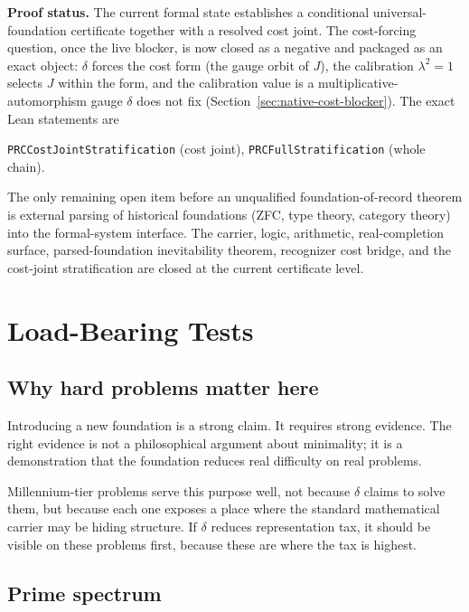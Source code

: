 \documentclass[11pt,a4paper]{article}
\theoremstyle{definition}
\theoremstyle{remark}
\begin{document}
\medskip
\noindent\textbf{Proof status.}
The current formal state establishes a conditional universal-foundation
certificate together with a resolved cost joint. The cost-forcing question, once
the live blocker, is now closed as a negative and packaged as an exact object:
$\delta$ forces the cost form (the gauge orbit of $J$), the calibration
$\lambda^2 = 1$ selects $J$ within the form, and the calibration value is a
multiplicative-automorphism gauge $\delta$ does not fix
(Section~\ref{sec:native-cost-blocker}). The exact Lean statements are
\begin{center}
  {\small
  \texttt{PRCCostJointStratification} \;(cost joint),\quad
  \texttt{PRCFullStratification} \;(whole chain).
  }
\end{center}
The only remaining open item before an unqualified foundation-of-record theorem
is external parsing of historical foundations (ZFC, type theory, category
theory) into the formal-system interface. The carrier, logic, arithmetic,
real-completion surface, parsed-foundation inevitability theorem, recognizer cost
bridge, and the cost-joint stratification are closed at the current certificate
level.

\section{Load-Bearing Tests}\label{sec:tests}

\subsection{Why hard problems matter here}

Introducing a new foundation is a strong claim. It requires strong evidence.
The right evidence is not a philosophical argument about minimality; it is a
demonstration that the foundation reduces real difficulty on real problems.

Millennium-tier problems serve this purpose well, not because $\delta$ claims
to solve them, but because each one exposes a place where the standard
mathematical carrier may be hiding structure. If $\delta$ reduces
representation tax, it should be visible on these problems first, because
these are where the tax is highest.

\subsection{Prime spectrum}
\end{document}
